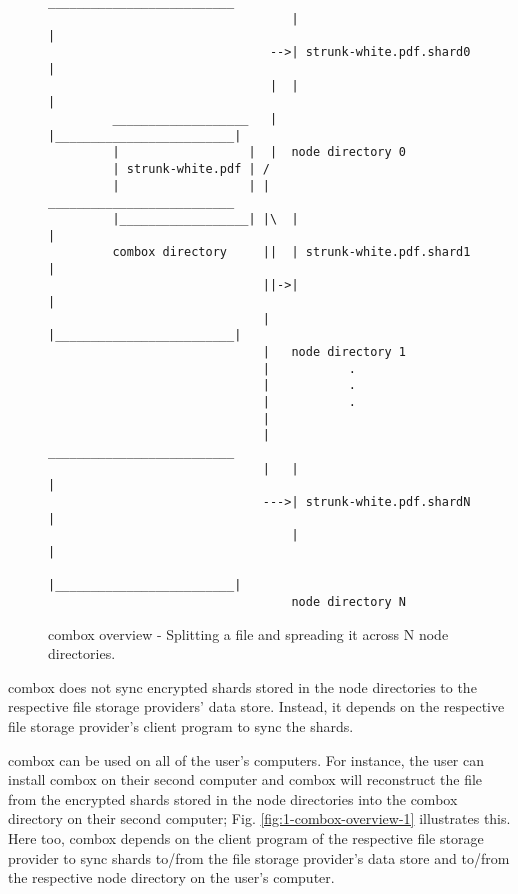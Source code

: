 \begin{figure}[h]
\begin{verbatim}

                                  __________________________
                                  |                         |
                               -->| strunk-white.pdf.shard0 |
                               |  |                         |
         ___________________   |  |_________________________|
         |                  |  |  node directory 0
         | strunk-white.pdf | /
         |                  | |   __________________________
         |__________________| |\  |                         |
         combox directory     ||  | strunk-white.pdf.shard1 |
                              ||->|                         |
                              |   |_________________________|
                              |   node directory 1
                              |           .
                              |           .
                              |           .
                              |
                              |   __________________________
                              |   |                         |
                              --->| strunk-white.pdf.shardN |
                                  |                         |
                                  |_________________________|
                                  node directory N
\end{verbatim}
  \caption{combox overview - Splitting a file and spreading it across
    N node directories.}
  \label{fig:1-combox-overview-0}
\end{figure}

combox does not sync encrypted shards stored in the node directories
to the respective file storage providers' data store. Instead, it
depends on the respective file storage provider's client program to
sync the shards.

combox can be used on all of the user's computers. For instance, the
user can install combox on their second computer and combox will
reconstruct the file from the encrypted shards stored in the node
directories into the combox directory on their second computer;
Fig. \ref{fig:1-combox-overview-1} illustrates this. Here too, combox
depends on the client program of the respective file storage provider
to sync shards to/from the file storage provider's data store and
to/from the respective node directory on the user's computer.

